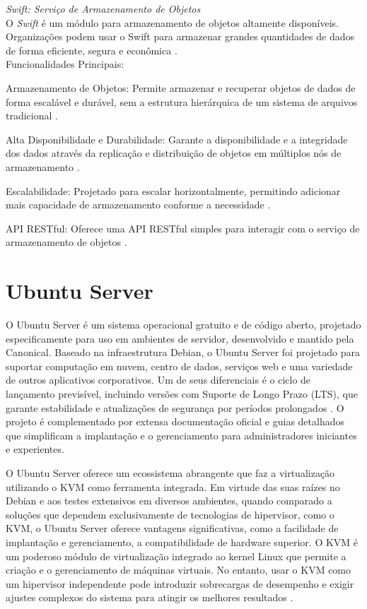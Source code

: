 \begin{description}
    \item \emph{Swift: Serviço de Armazenamento de Objetos}\\
    O  \textit{Swift} é um módulo para armazenamento de objetos altamente disponíveis. Organizações podem usar o Swift para armazenar grandes quantidades de dados de forma eficiente, segura e econômica \cite{openstackswift}.\\
    Funcionalidades Principais:
    \begin{description}
        \item Armazenamento de Objetos: Permite armazenar e recuperar objetos de dados de forma escalável e durável, sem a estrutura hierárquica de um sistema de arquivos tradicional \cite{openstackswift}.
        \item Alta Disponibilidade e Durabilidade: Garante a disponibilidade e a integridade dos dados através da replicação e distribuição de objetos em múltiplos nós de armazenamento  \cite{openstackswift}.
        \item Escalabilidade: Projetado para escalar horizontalmente, permitindo adicionar mais capacidade de armazenamento conforme a necessidade  \cite{openstackswift}.
        \item API RESTful: Oferece uma API RESTful simples para interagir com o serviço de armazenamento de objetos  \cite{openstackswift}.
    \end{description}
\end{description}

\section{Ubuntu Server}
O Ubuntu Server é um sistema operacional gratuito e de código aberto, projetado especificamente para uso em ambientes de servidor, desenvolvido e mantido pela Canonical. Baseado na infraestrutura Debian, o Ubuntu Server foi projetado para suportar computação em nuvem, centro de dados, serviços web e uma variedade de outros aplicativos corporativos. Um de seus diferenciais é o ciclo de lançamento previsível, incluindo versões com Suporte de Longo Prazo (LTS), que garante estabilidade e atualizações de segurança por períodos prolongados \cite{ubuntu2025}. O projeto é complementado por extensa documentação oficial e guias detalhados que simplificam a implantação e o gerenciamento para administradores iniciantes e experientes.

O Ubuntu Server oferece um ecossistema abrangente que faz a virtualização utilizando o KVM como ferramenta integrada. Em virtude das suas raízes no Debian e aos testes extensivos em diversos ambientes, quando comparado a soluções que dependem exclusivamente de tecnologias de hipervisor, como o KVM, o Ubuntu Server oferece vantagens significativas, como a facilidade de implantação e gerenciamento, a compatibilidade de hardware superior. O KVM é um poderoso módulo de virtualização integrado ao kernel Linux que permite a criação e o gerenciamento de máquinas virtuais. No entanto, usar o KVM como um hipervisor independente pode introduzir sobrecargas de desempenho e exigir ajustes complexos do sistema para atingir os melhores resultados \cite{reddy2014}.

